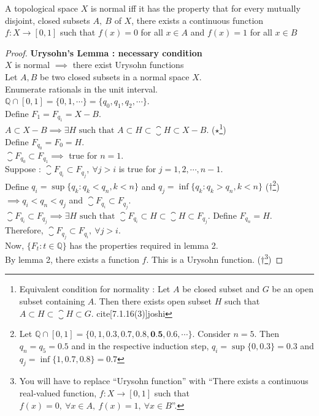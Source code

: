 \begin{theorem}
	A topological space $X$ is normal iff it has the property that for every mutually disjoint, closed subsets $A,\ B$ of $X$, there exists a continuous function \( f : X \to [0,1] \) such that \( f(x) = 0 \) for all $x \in A$ and \( f(x) = 1 \) for all \( x \in B \)
\end{theorem}
\begin{proof}
	\textbf{Urysohn's Lemma : necessary condition}\\
	$X$ is normal $\implies$ there exist Urysohn functions\\

	Let $A,B$ be two closed subsets in a normal space $X$.\\
	Enumerate rationals in the unit interval.\\
	$\mathbb{Q} \cap [0,1] = \{ 0, 1, \cdots \} = \{ q_0, q_1, q_2, \cdots \}$.\\
	Define $F_1 = F_{q_1} = X-B$. \\
	$A \subset X-B \implies\exists H \text{ such that } A \subset H \subset \closure{H} \subset X-B$.
	($\star$\footnote{Equivalent condition for normality : Let $A$ be closed subset and $G$ be an open subset containing $A$.
	Then there exists open subset $H$ such that $A \subset H \subset \closure{H} \subset G$.
	cite[7.1.16(3)]{joshi}})\\
	Define $F_{q_0} = F_0 = H$.\\

	$\closure{F_{q_0}} \subset F_{q_1} \implies $ true for $n = 1$.\\
	Suppose : $\closure{F_{q_i}} \subset F_{q_j},\ \forall j > i$ is true for $j = 1,2,\cdots,n-1$.\\
	Define $q_i = \sup \{ q_k : q_k < q_n, k < n \}$ and $q_j = \inf \{ q_k : q_k > q_n, k < n \}$ ($\dag$\footnote{ Let $\mathbb{Q}\cap[0,1] = \{ 0,1,0.3,0.7,0.8,\textbf{0.5},0.6,\cdots \}$.
	Consider $n = 5$.
	Then $q_n = q_5 = 0.5$ and in the respective induction step, $q_i = \sup\{0,0.3\} = 0.3$ and $q_j = \inf\{1,0.7,0.8\} = 0.7$}) \\
	$\implies q_i < q_n < q_j$ and $\closure{F_{q_i}} \subset F_{q_j}$.\\
	$\closure{F_{q_i}} \subset F_{q_j} \implies \exists H \text{ such that } \closure{F_{q_i}} \subset H \subset \closure{H} \subset F_{q_j}$.
	Define $F_{q_n} = H$.\\
	Therefore, $\closure{F_{q_j}} \subset F_{q_i},\ \forall j > i$.\\

	Now, $\{ F_t : t \in \mathbb{Q}\}$ has the properties required in lemma 2.\\
	By lemma 2, there exists a function $f$.
	This is a Urysohn function.
	($\dag$\footnote{You will have to replace ``Urysohn function'' with ``There exists a continuous real-valued function, $f : X \to [0,1]$ such that $f(x) = 0,\ \forall x \in A,\ f(x) = 1,\ \forall x \in B$''.})
\end{proof}


